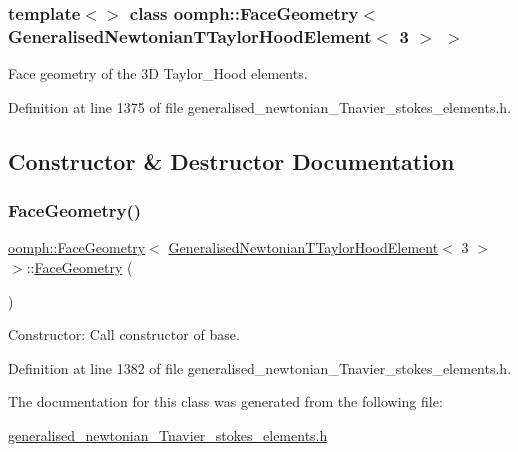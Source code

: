 \subsubsection*{template$<$$>$\newline
class oomph\+::\+Face\+Geometry$<$ Generalised\+Newtonian\+T\+Taylor\+Hood\+Element$<$ 3 $>$ $>$}

Face geometry of the 3D Taylor\+\_\+\+Hood elements. 

Definition at line 1375 of file generalised\+\_\+newtonian\+\_\+\+Tnavier\+\_\+stokes\+\_\+elements.\+h.



\subsection{Constructor \& Destructor Documentation}
\mbox{\label{classoomph_1_1FaceGeometry_3_01GeneralisedNewtonianTTaylorHoodElement_3_013_01_4_01_4_a3fd9f0d478b976a221b28e5a034d0dfd}} 
\subsubsection{\texorpdfstring{Face\+Geometry()}{FaceGeometry()}}
{\footnotesize\ttfamily \hyperlink{classoomph_1_1FaceGeometry}{oomph\+::\+Face\+Geometry}$<$ \hyperlink{classoomph_1_1GeneralisedNewtonianTTaylorHoodElement}{Generalised\+Newtonian\+T\+Taylor\+Hood\+Element}$<$ 3 $>$ $>$\+::\hyperlink{classoomph_1_1FaceGeometry}{Face\+Geometry} (\begin{DoxyParamCaption}{ }\end{DoxyParamCaption})\hspace{0.3cm}{\ttfamily [inline]}}



Constructor\+: Call constructor of base. 



Definition at line 1382 of file generalised\+\_\+newtonian\+\_\+\+Tnavier\+\_\+stokes\+\_\+elements.\+h.



The documentation for this class was generated from the following file\+:\begin{DoxyCompactItemize}
\item 
\hyperlink{generalised__newtonian__Tnavier__stokes__elements_8h}{generalised\+\_\+newtonian\+\_\+\+Tnavier\+\_\+stokes\+\_\+elements.\+h}\end{DoxyCompactItemize}
